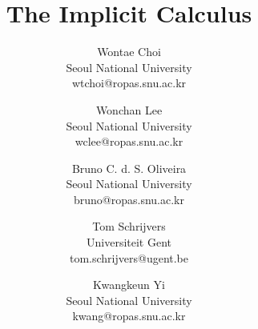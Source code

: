 \documentclass{rosaecmemo}
\begin{document}
\title{The Implicit Calculus}

\author{
  Wontae Choi \\
  Seoul National University\\
  wtchoi@ropas.snu.ac.kr \and
  Wonchan Lee \\
  Seoul National University\\
  wclee@ropas.snu.ac.kr \and
  Bruno C. d. S. Oliveira \\
  Seoul National University\\
  bruno@ropas.snu.ac.kr \and
  Tom Schrijvers \\
  Universiteit Gent\\
  tom.schrijvers@ugent.be \and
  Kwangkeun Yi \\
  Seoul National University\\
  kwang@ropas.snu.ac.kr
}

\maketitle

\begin{abstract}



\end{abstract}



















\end{document}

